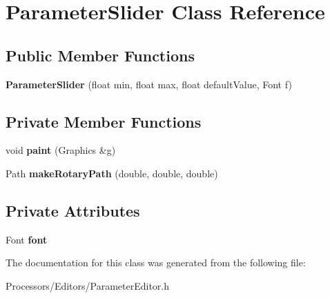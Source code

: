 \hypertarget{classParameterSlider}{\section{Parameter\-Slider Class Reference}
\label{classParameterSlider}
}
\subsection*{Public Member Functions}
\begin{DoxyCompactItemize}
\item 
\hypertarget{classParameterSlider_a545597c0f64eda6cb2ddb1f07d21eb4d}{{\bfseries Parameter\-Slider} (float min, float max, float default\-Value, Font f)}\label{classParameterSlider_a545597c0f64eda6cb2ddb1f07d21eb4d}

\end{DoxyCompactItemize}
\subsection*{Private Member Functions}
\begin{DoxyCompactItemize}
\item 
\hypertarget{classParameterSlider_ae7b164af4b95158aea4afcedcc5462ff}{void {\bfseries paint} (Graphics \&g)}\label{classParameterSlider_ae7b164af4b95158aea4afcedcc5462ff}

\item 
\hypertarget{classParameterSlider_a2624cc7dd3c685231028e3f46a235503}{Path {\bfseries make\-Rotary\-Path} (double, double, double)}\label{classParameterSlider_a2624cc7dd3c685231028e3f46a235503}

\end{DoxyCompactItemize}
\subsection*{Private Attributes}
\begin{DoxyCompactItemize}
\item 
\hypertarget{classParameterSlider_a9131919f5a994ad3815d19e98d7c11c2}{Font {\bfseries font}}\label{classParameterSlider_a9131919f5a994ad3815d19e98d7c11c2}

\end{DoxyCompactItemize}


The documentation for this class was generated from the following file\-:\begin{DoxyCompactItemize}
\item 
Processors/\-Editors/Parameter\-Editor.\-h\end{DoxyCompactItemize}
